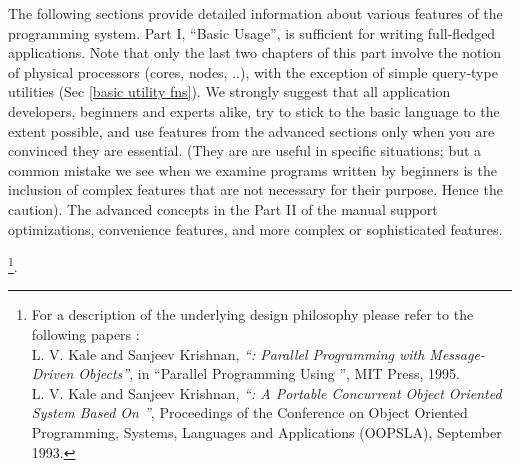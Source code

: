 The following sections provide detailed information about various features of the
\charm programming system. Part I, ``Basic Usage'', is sufficient
for writing full-fledged applications. Note that only the last two
chapters of this part involve the notion of physical processors
(cores, nodes, ..), with the exception of simple query-type utilities
(Sec \ref{basic utility fns}). We strongly suggest that all
application developers, beginners and experts alike, try to stick to
the basic language to the extent possible, and use features from the
advanced sections only when you are convinced they are
essential. (They are are useful in specific situations; but a common
mistake we see when we examine programs written by beginners is the
inclusion of complex features that are not necessary for their
purpose. Hence the caution). The advanced concepts in the Part II of
the manual support optimizations, convenience features, and more
complex or sophisticated features.


\footnote{For a description of the underlying design
philosophy please refer to the following papers :\\
    L. V. Kale and Sanjeev Krishnan,
    {\em ``\charm : Parallel Programming with Message-Driven Objects''},
    in ``Parallel Programming Using \CC'',
    MIT Press, 1995. \\
    L. V. Kale and Sanjeev Krishnan,
    {\em ``\charm : A Portable Concurrent Object Oriented System
    Based On \CC''},
    Proceedings of the Conference on Object Oriented Programming,
    Systems, Languages and Applications (OOPSLA), September 1993.
}.

